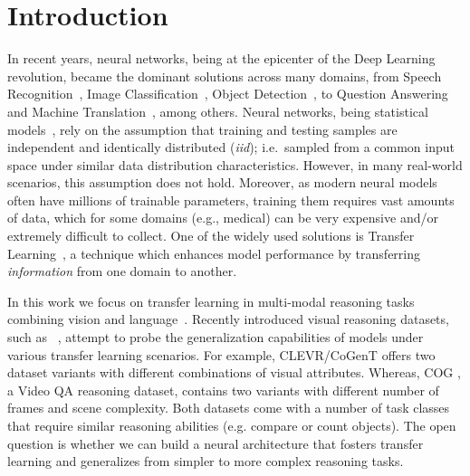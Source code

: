 \section{Introduction}
In recent years, neural networks, being at the epicenter of the Deep Learning~\cite{lecun2015deep} revolution, became the dominant solutions across many domains, from Speech Recognition~\cite{graves2013speech}, Image Classification~\cite{krizhevsky2012imagenet}, Object Detection~\cite{redmon2016you}, to Question Answering~\cite{weston2014memory} and Machine Translation~\cite{bahdanau2014neural}, among others.
Neural networks, being statistical models~\cite{ripley1993statistical,warner1996understanding}, rely on the assumption that training and testing samples are independent and identically distributed (\textit{iid}); i.e.\ sampled from a common input space under similar data distribution characteristics.
However, in many real-world scenarios, this assumption does not hold. Moreover, as modern neural models often have millions of trainable parameters, training them requires vast amounts of data, which for some domains (e.g., medical) can be very expensive and/or extremely difficult to collect.
One of the widely used solutions is Transfer Learning~\cite{pan2009survey,weiss2016survey}, a technique which enhances model performance by transferring \emph{information} from one domain to another.


In this work we focus on transfer learning in multi-modal reasoning tasks combining vision and language~\cite{mogadala2019trends}. Recently introduced visual reasoning datasets, such as ~\cite{johnson2017clevr,yang2018dataset,song2018explore}, attempt to probe the generalization capabilities of models under various transfer learning scenarios. For example, CLEVR/CoGenT \cite{johnson2017clevr} offers two dataset variants with different combinations of visual attributes. Whereas, COG \cite{yang2018dataset}, a Video QA reasoning dataset, contains two variants with different number of frames and scene complexity.  Both datasets come with a number of task classes that require similar reasoning abilities (e.g. compare or count objects).
The open question is whether we can build a neural architecture that fosters transfer learning and generalizes from simpler to more complex reasoning tasks.



